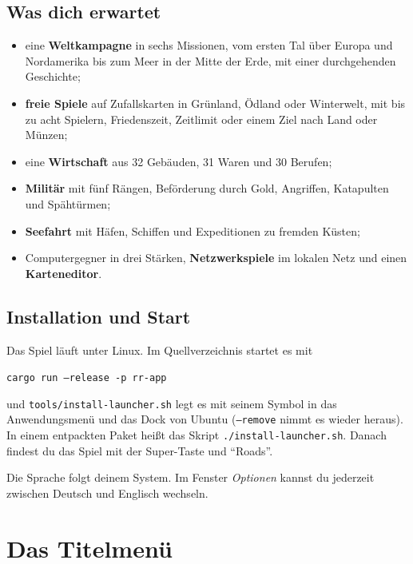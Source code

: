 \documentclass[a4paper,11pt,oneside,DIV=12,headings=small,toc=chapterentrydotfill]{scrbook}
\begin{document}

\section*{Was dich erwartet}
\begin{itemize}
  \item eine \textbf{Weltkampagne} in sechs Missionen, vom ersten Tal über Europa und Nordamerika bis zum
    Meer in der Mitte der Erde, mit einer durchgehenden Geschichte;
  \item \textbf{freie Spiele} auf Zufallskarten in Grünland, Ödland oder Winterwelt, mit bis zu acht Spielern,
    Friedenszeit, Zeitlimit oder einem Ziel nach Land oder Münzen;
  \item eine \textbf{Wirtschaft} aus 32 Gebäuden, 31 Waren und 30 Berufen;
  \item \textbf{Militär} mit fünf Rängen, Beförderung durch Gold, Angriffen, Katapulten und Spähtürmen;
  \item \textbf{Seefahrt} mit Häfen, Schiffen und Expeditionen zu fremden Küsten;
  \item Computergegner in drei Stärken, \textbf{Netzwerkspiele} im lokalen Netz und einen \textbf{Karteneditor}.
\end{itemize}

\section*{Installation und Start}
Das Spiel läuft unter Linux. Im Quellverzeichnis startet es mit
\begin{center}\texttt{cargo run --release -p rr-app}\end{center}
und \texttt{tools/install-launcher.sh} legt es mit seinem Symbol in das Anwendungsmenü und das Dock von Ubuntu
(\texttt{--remove} nimmt es wieder heraus). In einem entpackten Paket heißt das Skript
\texttt{./install-launcher.sh}. Danach findest du das Spiel mit der Super-Taste und \enquote{Roads}.

Die Sprache folgt deinem System. Im Fenster \emph{Optionen} kannst du jederzeit zwischen Deutsch und Englisch
wechseln.

\chapter{Das Titelmenü}
\end{document}
